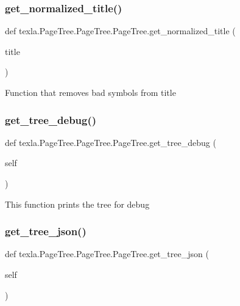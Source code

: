 \subsubsection{\texorpdfstring{get\+\_\+normalized\+\_\+title()}{get\_normalized\_title()}}
{\footnotesize\ttfamily def texla.\+Page\+Tree.\+Page\+Tree.\+Page\+Tree.\+get\+\_\+normalized\+\_\+title (\begin{DoxyParamCaption}\item[{}]{title }\end{DoxyParamCaption})\hspace{0.3cm}{\ttfamily [static]}}

\begin{DoxyVerb}Function that removes bad symbols from title\end{DoxyVerb}
 \hypertarget{classtexla_1_1PageTree_1_1PageTree_1_1PageTree_ab6d7f8cb1defc5738cac8da13de74809}{}\label{classtexla_1_1PageTree_1_1PageTree_1_1PageTree_ab6d7f8cb1defc5738cac8da13de74809} 
\subsubsection{\texorpdfstring{get\+\_\+tree\+\_\+debug()}{get\_tree\_debug()}}
{\footnotesize\ttfamily def texla.\+Page\+Tree.\+Page\+Tree.\+Page\+Tree.\+get\+\_\+tree\+\_\+debug (\begin{DoxyParamCaption}\item[{}]{self }\end{DoxyParamCaption})}

\begin{DoxyVerb}This function prints the tree for debug\end{DoxyVerb}
 \hypertarget{classtexla_1_1PageTree_1_1PageTree_1_1PageTree_aa01020f0c674d653538d819e6f1ca231}{}\label{classtexla_1_1PageTree_1_1PageTree_1_1PageTree_aa01020f0c674d653538d819e6f1ca231} 
\subsubsection{\texorpdfstring{get\+\_\+tree\+\_\+json()}{get\_tree\_json()}}
{\footnotesize\ttfamily def texla.\+Page\+Tree.\+Page\+Tree.\+Page\+Tree.\+get\+\_\+tree\+\_\+json (\begin{DoxyParamCaption}\item[{}]{self }\end{DoxyParamCaption})}

